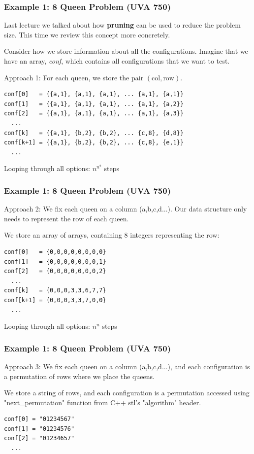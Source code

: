 \begin{frame}[fragile]
  \frametitle{Example 1: 8 Queen Problem (UVA 750)}

  Last lecture we talked about how {\bf pruning} can be used to reduce the problem size. This time we review this concept more concretely.\bigskip

  Consider how we store information about all the configurations. Imagine that we have an array, \emph{conf}, which contains all configurations that we want to test.
  \bigskip

  Approach 1: For each queen, we store the pair $(\text{col},\text{row})$.
\begin{verbatim}
conf[0]   = {{a,1}, {a,1}, {a,1}, ... {a,1}, {a,1}}
conf[1]   = {{a,1}, {a,1}, {a,1}, ... {a,1}, {a,2}}
conf[2]   = {{a,1}, {a,1}, {a,1}, ... {a,1}, {a,3}}
  ...
conf[k]   = {{a,1}, {b,2}, {b,2}, ... {c,8}, {d,8}}
conf[k+1] = {{a,1}, {b,2}, {b,2}, ... {c,8}, {e,1}}
  ...
\end{verbatim}

Looping through all options: $n^{n^2}$ steps
\end{frame}

\begin{frame}[fragile]
  \frametitle{Example 1: 8 Queen Problem (UVA 750)}
  Approach 2: We fix each queen on a column (a,b,c,d...). Our data structure only needs to represent the row of each queen. \bigskip

  We store an array of arrays, containing 8 integers representing the row:\bigskip
\begin{verbatim}
conf[0]   = {0,0,0,0,0,0,0,0}
conf[1]   = {0,0,0,0,0,0,0,1}
conf[2]   = {0,0,0,0,0,0,0,2}
  ...
conf[k]   = {0,0,0,3,3,6,7,7}
conf[k+1] = {0,0,0,3,3,7,0,0}
  ...
\end{verbatim}
Looping through all options: $n^n$ steps
\end{frame}

\begin{frame}[fragile]
  \frametitle{Example 1: 8 Queen Problem (UVA 750)}
  Approach 3: We fix each queen on a column (a,b,c,d...), and each configuration
  is a permutation of rows where we place the queens. \bigskip

  We store a string of rows, and each configuration is a permutation accessed using "next\_permutation" function from C++ stl's "algorithm" header. \bigskip

\begin{verbatim}
conf[0] = "01234567"
conf[1] = "01234576"
conf[2] = "01234657"
  ...
\end{verbatim}
\end{frame}

